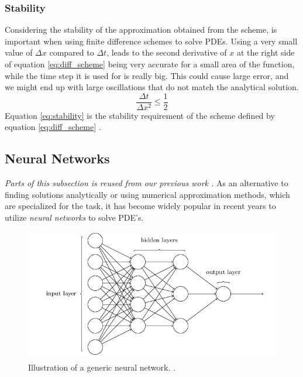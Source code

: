 \subsubsection{Stability}
Considering the stability of the approximation obtained from the scheme, is important when using finite difference schemes to solve PDEs.
Using a very small value of $\Delta x$ compared to $\Delta t$, leads to the second derivative of $x$ at the right side of equation \eqref{eq:diff_scheme} being very accurate for a small area of the function, while the time step it is used for is really big.
This could cause large error, and we might end up with large oscillations that do not match the analytical solution.
\begin{equation}
    \label{eq:stability}
    \frac{\Delta t}{\Delta x^2} \leq \frac{1}{2}
\end{equation}
Equation \eqref{eq:stability} is the stability requirement of the scheme defined by equation \eqref{eq:diff_scheme} \citep[p. 130]{tveitoPDE}.
\subsection{Neural Networks } 
\textit{Parts of this subsection is reused from our previous work \citep[p. 4]{project2}.}
As an alternative to finding solutions analytically or using numerical approximation methods, which are specialized for the task, it has become widely popular in recent years to utilize \textit{neural networks} to solve PDE's.


\begin{figure}[H]
    \centering
    \includegraphics[width=1\linewidth]{project_2/figures/generic_NN.png}
    \caption{Illustration of a generic neural network. \cite[Taken from][Ch.1]{nielsen}.}
    \label{fig:NN}
\end{figure}

